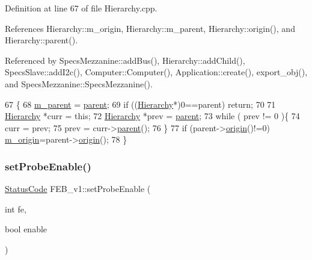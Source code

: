Definition at line 67 of file Hierarchy.\+cpp.



References Hierarchy\+::m\+\_\+origin, Hierarchy\+::m\+\_\+parent, Hierarchy\+::origin(), and Hierarchy\+::parent().



Referenced by Specs\+Mezzanine\+::add\+Bus(), Hierarchy\+::add\+Child(), Specs\+Slave\+::add\+I2c(), Computer\+::\+Computer(), Application\+::create(), export\+\_\+obj(), and Specs\+Mezzanine\+::\+Specs\+Mezzanine().


\begin{DoxyCode}
67                                               \{
68   \hyperlink{classHierarchy_a5814bb280d4e8539ab25ab6cbfb9cc4f}{m\_parent} = \hyperlink{classHierarchy_a1c7bec8257e717f9c1465e06ebf845fc}{parent};
69   \textcolor{keywordflow}{if} ((\hyperlink{classHierarchy}{Hierarchy}*)0==parent) \textcolor{keywordflow}{return};
70 
71   \hyperlink{classHierarchy}{Hierarchy} *curr = \textcolor{keyword}{this};
72   \hyperlink{classHierarchy}{Hierarchy} *prev = \hyperlink{classHierarchy_a1c7bec8257e717f9c1465e06ebf845fc}{parent};
73   \textcolor{keywordflow}{while} ( prev != 0 )\{
74     curr = prev;
75     prev = curr->\hyperlink{classHierarchy_a1c7bec8257e717f9c1465e06ebf845fc}{parent}();
76   \}
77   \textcolor{keywordflow}{if} (parent->\hyperlink{classHierarchy_aee461dc930ce3871636ff87f075b1b83}{origin}()!=0) \hyperlink{classHierarchy_a16c73e557d3a7c156ffb5dc4102d148e}{m\_origin}=parent->\hyperlink{classHierarchy_aee461dc930ce3871636ff87f075b1b83}{origin}();
78 \}
\end{DoxyCode}
\mbox{\label{classFEB__v1_abb013a3441c02f57cea07a244554fdd5}} 
\subsubsection{\texorpdfstring{set\+Probe\+Enable()}{setProbeEnable()}}
{\footnotesize\ttfamily \hyperlink{classStatusCode}{Status\+Code} F\+E\+B\+\_\+v1\+::set\+Probe\+Enable (\begin{DoxyParamCaption}\item[{int}]{fe,  }\item[{bool}]{enable }\end{DoxyParamCaption})}



